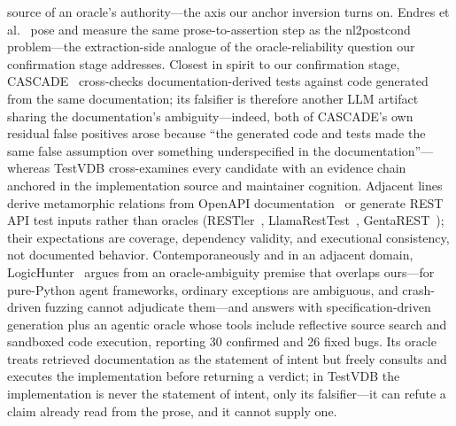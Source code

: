 \documentclass[acmsmall,screen,review,anonymous]{acmart}
\newcommand{\system}{TestVDB}
\begin{document}
source of an oracle's authority---the axis our anchor inversion turns on. Endres et al.~\cite{endres24} pose and measure the same prose-to-assertion step as the nl2postcond problem---the extraction-side analogue of the oracle-reliability question our confirmation stage addresses. Closest in spirit to our confirmation stage, CASCADE~\cite{cascade26} cross-checks documentation-derived tests against code generated from the same documentation; its falsifier is therefore another LLM artifact sharing the documentation's ambiguity---indeed, both of CASCADE's own residual false positives arose because ``the generated code and tests made the same false assumption over something underspecified in the documentation''---whereas \system{} cross-examines every candidate with an evidence chain anchored in the implementation source and maintainer cognition. Adjacent lines derive metamorphic relations from OpenAPI documentation~\cite{armeta26} or generate REST API test inputs rather than oracles (RESTler~\cite{restler19}, LlamaRestTest~\cite{llamaresttest25}, GentaREST~\cite{gentarest25}); their expectations are coverage, dependency validity, and executional consistency, not documented behavior. Contemporaneously and in an adjacent domain, LogicHunter~\cite{logichunter26} argues from an oracle-ambiguity premise that overlaps ours---for pure-Python agent frameworks, ordinary exceptions are ambiguous, and crash-driven fuzzing cannot adjudicate them---and answers with specification-driven generation plus an agentic oracle whose tools include reflective source search and sandboxed code execution, reporting 30 confirmed and 26 fixed bugs. Its oracle treats retrieved documentation as the statement of intent but freely consults and executes the implementation before returning a verdict; in \system{} the implementation is never the statement of intent, only its falsifier---it can refute a claim already read from the prose, and it cannot supply one.
\end{document}
